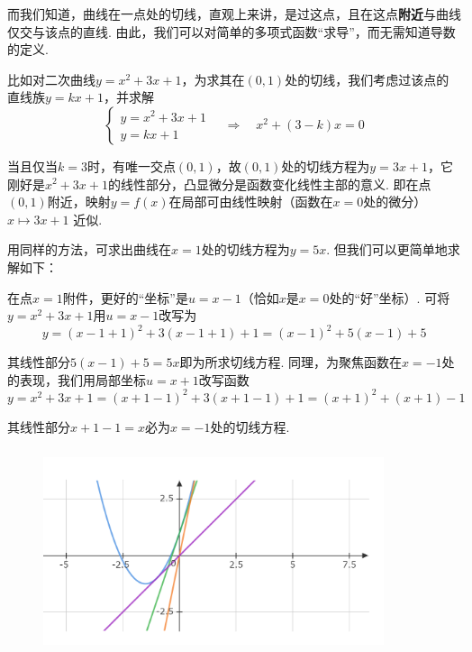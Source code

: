 \documentclass{article}
\begin{document}
而我们知道，曲线在一点处的切线，直观上来讲，是过这点，且在这点\textbf{附近}与曲线仅交与该点的直线. 由此，我们可以对简单的多项式函数“求导”，而无需知道导数的定义. 

\vspace{3pt}

比如对二次曲线$y=x^{2}+3x+1$，为求其在$(0,1)$处的切线，我们考虑过该点的直线族$y=kx+1$，并求解\[\left\{\begin{array}{c}
     y=x^{2}+3x+1  \\
     y=kx+1
\end{array}\right.\quad \Longrightarrow\quad x^{2}+(3-k)x=0\]

当且仅当$k=3$时，有唯一交点$(0,1)$，故$(0,1)$处的切线方程为$y=3x+1$，它刚好是$x^{2}+3x+1$的线性部分，凸显微分是函数变化线性主部的意义. 即在点$(0,1)$附近，映射$y=f(x)$在局部可由线性映射（函数在$x=0$处的微分）$x\longmapsto 3x+1$ 近似. 

\vspace{3pt}

用同样的方法，可求出曲线在$x=1$处的切线方程为$y=5x$. 但我们可以更简单地求解如下：

\vspace{3pt}

在点$x=1$附件，更好的“坐标”是$u=x-1$（恰如$x$是$x=0$处的“好”坐标）. 可将$y=x^{2}+3x+1$用$u=x-1$改写为
\[y=(x-1+1)^{2}+3(x-1+1)+1=(x-1)^{2}+5(x-1)+5\]

其线性部分$5(x-1)+5=5x$即为所求切线方程. 同理，为聚焦函数在$x=-1$处的表现，我们用局部坐标$u=x+1$改写函数\[y=x^{2}+3x+1=(x+1-1)^{2}+3(x+1-1)+1=(x+1)^{2}+(x+1)-1\]

其线性部分$x+1-1=x$必为$x=-1$处的切线方程. 

\begin{figure}[h]
\includegraphics[height=6cm,width=10cm]{de.PNG}
\centering
\end{figure}
\end{document}
